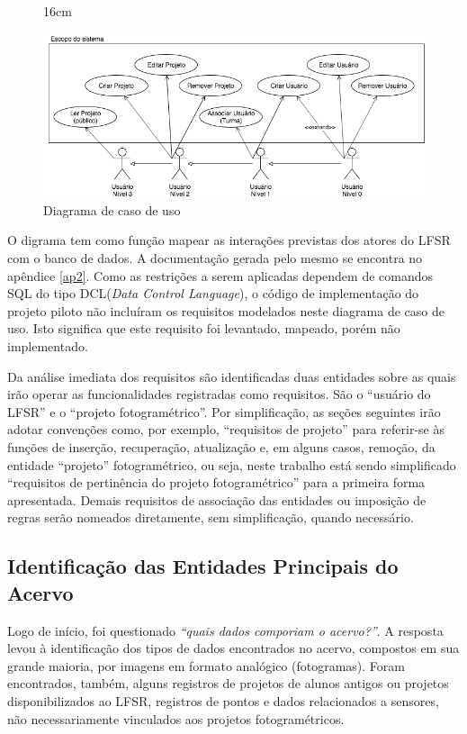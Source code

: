 \begin{figure}[!H]{16cm}
  \caption{Diagrama de caso de uso} \label{usecase}
  \centering
  \includegraphics[width=1.0\hsize]{figuras/diag_use_case.png}
\end{figure}

O digrama tem como função mapear as interações previstas dos atores do LFSR com o banco de dados. A documentação gerada pelo mesmo se encontra no apêndice \ref{ap2}. Como as restrições a serem aplicadas dependem de comandos SQL do tipo DCL(\textit{Data Control Language}), o código de implementação do projeto piloto não incluíram os requisitos modelados neste diagrama de caso de uso. Isto significa que este requisito foi levantado, mapeado, porém não implementado.

Da análise imediata dos requisitos são identificadas duas entidades sobre as quais irão operar as funcionalidades registradas como requisitos. São o ``usuário do LFSR'' e o ``projeto fotogramétrico''. Por simplificação, as seções seguintes irão adotar convenções como, por exemplo, ``requisitos de projeto'' para referir-se às funções de inserção, recuperação, atualização e, em alguns casos, remoção, da entidade ``projeto'' fotogramétrico, ou seja, neste trabalho está sendo simplificado ``requisitos de pertinência do projeto fotogramétrico'' para a primeira forma apresentada. Demais requisitos de associação das entidades ou imposição de regras serão nomeados diretamente, sem simplificação, quando necessário.


\subsection{Identificação das Entidades Principais do Acervo} \label{entidades}

Logo de início, foi questionado \textit{``quais dados comporiam o acervo?''}. A resposta levou à identificação dos tipos de dados encontrados no acervo, compostos em sua grande maioria, por imagens em formato analógico (fotogramas). Foram encontrados, também, alguns registros de projetos de alunos antigos ou projetos disponibilizados ao LFSR, registros de pontos e dados relacionados a sensores, não necessariamente vinculados aos projetos fotogramétricos.

